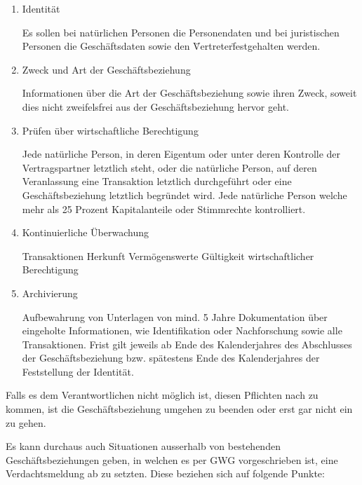 \documentclass{article}
\begin{document}
        \begin{enumerate}

            \item Identität

                Es sollen bei natürlichen Personen die Personendaten und bei juristischen Personen die Geschäftsdaten sowie den \"Vertreter\" festgehalten werden.

            \item Zweck und Art der Geschäftsbeziehung

                Informationen über die Art der Geschäftsbeziehung sowie ihren Zweck, soweit dies nicht zweifelsfrei aus der Geschäftsbeziehung hervor geht.


            \item Prüfen über wirtschaftliche Berechtigung
     
                Jede natürliche Person, in deren Eigentum oder unter deren Kontrolle der Vertragspartner letztlich steht, oder die natürliche Person, auf deren Veranlassung eine Transaktion letztlich durchgeführt oder eine Geschäftsbeziehung letztlich begründet wird.
                Jede natürliche Person welche mehr als 25 Prozent Kapitalanteile oder Stimmrechte kontrolliert.

            \item Kontinuierliche Überwachung

                Transaktionen
                Herkunft Vermögenswerte
                Gültigkeit wirtschaftlicher Berechtigung

            \item Archivierung

                Aufbewahrung von Unterlagen von mind. 5 Jahre
                Dokumentation über eingeholte Informationen, wie Identifikation oder Nachforschung sowie alle Transaktionen.
                Frist gilt jeweils ab Ende des Kalenderjahres des Abschlusses der Geschäftsbeziehung bzw. spätestens Ende des Kalenderjahres der Feststellung der Identität.

        \end{enumerate}                
    
        Falls es dem Verantwortlichen nicht möglich ist, diesen Pflichten nach zu kommen, ist die Geschäftsbeziehung umgehen zu beenden oder erst gar nicht ein zu gehen.
        
        Es kann durchaus auch Situationen ausserhalb von bestehenden Geschäftsbeziehungen geben, in welchen es per GWG vorgeschrieben ist, eine Verdachtsmeldung ab zu setzten. Diese beziehen sich auf folgende Punkte:
\end{document}
